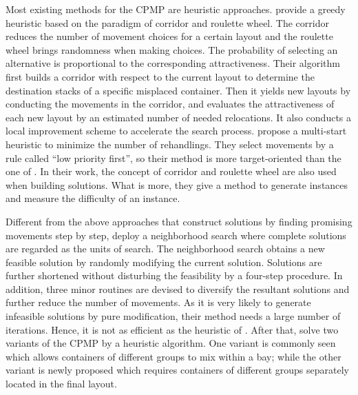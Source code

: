 \documentclass[review,3p,times,authoryear,12pt]{elsarticle}
\begin{document}
Most existing methods for the CPMP are heuristic approaches. \cite{Caserta2009} provide a greedy heuristic based on the paradigm of corridor and roulette wheel. The corridor reduces the number of movement choices for a certain layout and the roulette wheel brings randomness when making choices. The probability of selecting an alternative is proportional to the corresponding attractiveness.
Their algorithm first builds a corridor with respect to the current layout to determine the destination stacks of a specific misplaced container. Then it yields new layouts by conducting the movements in the corridor, and evaluates the attractiveness of each new layout by an estimated number of needed relocations. It also conducts a local improvement scheme to accelerate the search process.
\cite{Exposito2012} propose a multi-start heuristic to minimize the number of rehandlings. They select movements by a rule called ``low priority first'', so their method is more target-oriented than the one of \cite{Caserta2009}. In their work, the concept of corridor and roulette wheel are also used when building solutions. What is more, they give a method to generate instances and measure the difficulty of an instance.

Different from the above approaches that construct solutions by finding promising movements step by step, \cite{Lee2009} deploy a neighborhood search where complete solutions are regarded as the units of search. The neighborhood search obtains a new feasible solution by randomly modifying the current solution.
Solutions are further shortened without disturbing the feasibility by a four-step procedure. In addition, three minor routines are devised to diversify the resultant solutions and further reduce the number of movements. As it is very likely to generate infeasible solutions by pure modification, their method needs a large number of iterations. Hence, it is not as efficient as the heuristic of \cite{Exposito2012}.
After that, \cite{Huang2012heu} solve two variants of the CPMP by a heuristic algorithm. One variant is commonly seen which allows containers of different groups to mix within a bay; while the other variant is newly proposed which requires containers of different groups separately located in the final layout.
\end{document}
